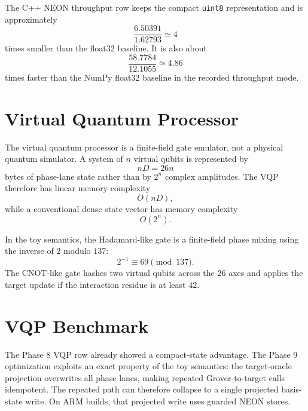\documentclass[11pt]{article}
\begin{document}
The C++ NEON throughput row keeps the compact \texttt{uint8} representation and is
approximately
\begin{equation}
    \frac{6.50391}{1.62793}\simeq4
\end{equation}
times smaller than the float32 baseline.  It is also about
\begin{equation}
    \frac{58.7784}{12.1055}\simeq4.86
\end{equation}
times faster than the NumPy float32 baseline in the recorded throughput mode.

\section{Virtual Quantum Processor}

The virtual quantum processor is a finite-field gate emulator, not a physical
quantum simulator.  A system of $n$ virtual qubits is represented by
\begin{equation}
    nD = 26n
\end{equation}
bytes of phase-lane state rather than by $2^n$ complex amplitudes.  The VQP
therefore has linear memory complexity
\begin{equation}
    O(nD),
\end{equation}
while a conventional dense state vector has memory complexity
\begin{equation}
    O(2^n).
\end{equation}

In the toy semantics, the Hadamard-like gate is a finite-field phase mixing
using the inverse of $2$ modulo $137$:
\begin{equation}
    2^{-1}\equiv69\pmod{137}.
\end{equation}
The CNOT-like gate hashes two virtual qubits across the $26$ axes and applies
the target update if the interaction residue is at least $42$.

\section{VQP Benchmark}

The Phase 8 VQP row already showed a compact-state advantage.  The Phase 9
optimization exploits an exact property of the toy semantics: the
target-oracle projection overwrites all phase lanes, making repeated
Grover-to-target calls idempotent.  The repeated path can therefore collapse to
a single projected basis-state write.  On ARM builds, that projected write uses
guarded NEON stores.
\end{document}
